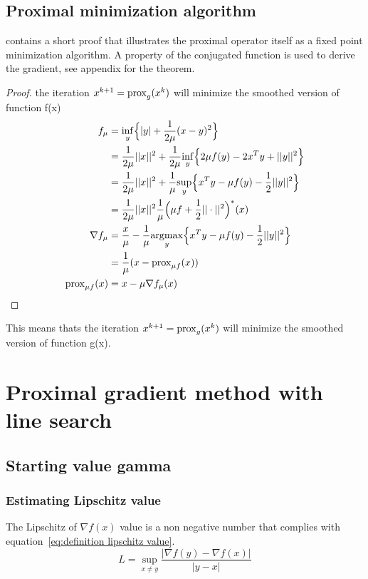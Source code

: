 	\subsection{Proximal minimization algorithm}
		 \cite{QianYang} contains a short proof that illustrates the proximal operator itself as a fixed point minimization algorithm. A property of the conjugated function is used to derive the gradient, see appendix for the theorem.
		 \begin{proof}
		 	the iteration $x^{k+1}=\operatorname{prox}_g(x^k)$ will minimize the smoothed version of function f(x) 
		 	\begin{align*}
		 	f_{\mu}
		 	&= \underset{y}{\inf}\Big\{ |y| +\frac{1}{2 \mu}(x-y)^2 \Big\} \\
		 	&=   \frac{1}{2 \mu}||x||^2 + \frac{1}{2\mu} 
		 	\underset{y}{\inf}\Big\{
		 	2 \mu f(y) - 2x^T y + ||y||^2
		 	\Big\} \\
		 	&=  \frac{1}{2 \mu}||x||^2 + \frac{1}{\mu} 
		 	\underset{y}{\sup}\Big\{
		 	x^T y  - \mu f(y) - \frac{1}{2} ||y||^2 \Big \} \\
		 	&= \frac{1}{2\mu }||x||^2 \frac{1}{\mu } \Big( \mu f + \frac{1}{2}||\cdot||^2 \Big)^* (x) \\
		 	\nabla  f_{\mu} 
		 	&= \frac{x}{\mu} - \frac{1}{\mu} \underset{y}{\operatorname{argmax}} 
		 	\Big \{ x^Ty - \mu f(y) - \frac{1}{2}||y||^2 \Big \}\\
		 	& = \frac{1}{\mu}(x - \operatorname{prox}_{\mu f}(x)) \\
		 	\operatorname{prox}_{\mu f}(x)
		 	& = x- \mu \nabla f_{\mu}(x)
		 	\end{align*}
		 	\label{prf:proximal minimiztion alg proof}
		 \end{proof}

		 This means thats the iteration $x^{k+1}=\operatorname{prox}_g(x^k)$ will minimize the smoothed version of function g(x). 

\section{Proximal gradient method with line search}
	\subsection{Starting value gamma }
		\subsubsection{Estimating Lipschitz value}
			The Lipschitz of $\nabla f(x)$ value is a non negative number that complies with equation~\ref{eq:definition lipschitz value}.
			\begin{equation}
			L = \underset{x \neq y}{\sup} \frac{|\nabla f(y)-\nabla f(x)|}{|y-x|}
			\label{eq:definition lipschitz value}
			\end{equation}
			
